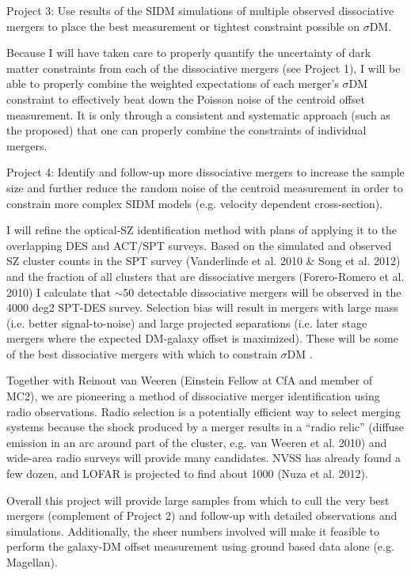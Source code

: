 Project 3: Use results of the SIDM simulations of multiple observed dissociative mergers to place the best measurement or tightest constraint possible on $\sigma$DM.  

Because I will have taken care to properly quantify the uncertainty of dark matter constraints from each of the dissociative mergers (see Project 1), I will be able to properly combine the weighted expectations of each merger’s $\sigma$DM  constraint to effectively beat down the Poisson noise of the centroid offset measurement.   It is only through a consistent and systematic approach (such as the proposed) that one can properly combine the constraints of individual mergers. 

Project 4: Identify and follow-up more dissociative mergers to increase the sample size and further reduce the random noise of the centroid measurement in order to constrain more complex SIDM models (e.g. velocity dependent cross-section).

I will refine the optical-SZ identification method with plans of applying it to the overlapping DES and ACT/SPT surveys.  Based on the simulated and observed SZ cluster counts in the SPT survey (Vanderlinde et al. 2010 \& Song et al. 2012) and the fraction of all clusters that are dissociative mergers (Forero-Romero et al. 2010) I calculate that $\sim$50 detectable dissociative mergers will be observed in the 4000 deg2 SPT-DES survey.  Selection bias will result in mergers with large mass (i.e. better signal-to-noise) and large projected separations (i.e. later stage mergers where the expected DM-galaxy offset is maximized).  These will be some of the best dissociative mergers with which to constrain $\sigma$DM .

Together with Reinout van Weeren (Einstein Fellow at CfA and member of MC2), we are pioneering a method of dissociative merger identification using radio observations.  Radio selection is a potentially efficient way to select merging systems because the shock produced by a merger results in a ``radio relic'' (diffuse emission in an arc around part of the cluster, e.g. van Weeren et al. 2010) and wide-area radio surveys will provide many candidates. NVSS has already found a few dozen, and LOFAR is projected to find about 1000 (Nuza et al. 2012).

Overall this project will provide large samples from which to cull the very best mergers (complement of Project 2) and follow-up with detailed observations and simulations.  Additionally, the sheer numbers involved will make it feasible to perform the galaxy-DM offset measurement using ground based data alone (e.g. Magellan).


